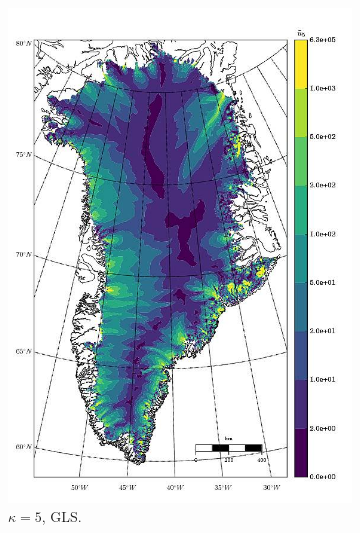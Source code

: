 \begin{figure}
  \begin{subfigure}[b]{0.25\linewidth}
    \includegraphics[width=\linewidth]{images/balance_velocity/greenland/d_U_ob/Ubar_5H_kappa_5_GLS.jpg}
  \caption{$\kappa = 5$, GLS.}
  \label{greenland_bv_image_d_U_ob_kappa_5_GLS}
  \end{subfigure}
  \begin{subfigure}[b]{0.25\linewidth}

\end{subfigure}
\end{figure}
